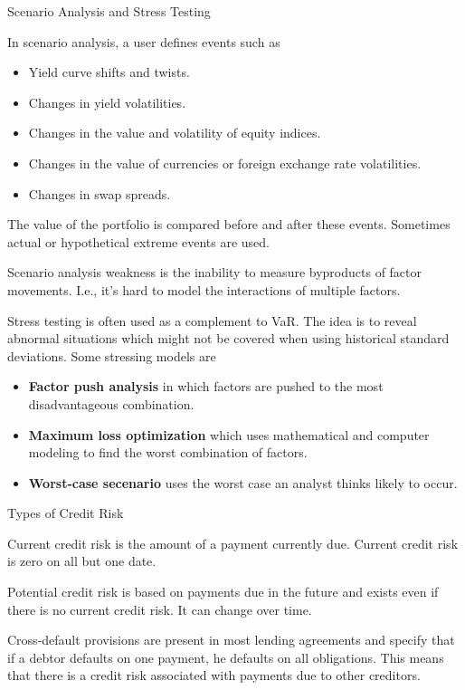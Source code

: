 \documentclass[../custom]{flashcards}
\begin{document}
\begin{flashcard}[\studyArea]{Scenario Analysis and Stress Testing}
    \begin{flushleft}
        In scenario analysis, a user defines events such as
        \begin{itemize}[parsep=1pt,itemsep=1pt]
            \item Yield curve shifts and twists.
            \item Changes in yield volatilities.
            \item Changes in the value and volatility of equity indices.
            \item Changes in the value of currencies or foreign exchange rate volatilities.
            \item Changes in swap spreads.
        \end{itemize}
        The value of the portfolio is compared before and after these events. Sometimes actual or hypothetical extreme events are used.\newline

        Scenario analysis weakness is the inability to measure byproducts of factor movements. I.e., it's hard to model the interactions of multiple factors.\newline

        Stress testing is often used as a complement to VaR. The idea is to reveal abnormal situations which might not be covered when using historical standard deviations. Some stressing models are
        \begin{itemize}[parsep=1pt,itemsep=1pt]
            \item \textbf{Factor push analysis} in which factors are pushed to the most disadvantageous combination.
            \item \textbf{Maximum loss optimization} which uses mathematical and computer modeling to find the worst combination of factors.
            \item \textbf{Worst-case secenario} uses the worst case an analyst thinks likely to occur.
        \end{itemize}
    \end{flushleft}
\end{flashcard}

\begin{flashcard}[\studyArea]{Types of Credit Risk}
    \begin{flushleft}
        Current credit risk is the amount of a payment currently due. Current credit risk is zero on all but one date.\newline

        Potential credit risk is based on payments due in the future and exists even if there is no current credit risk. It can change over time.\newline

        Cross-default provisions are present in most lending agreements and specify that if a debtor defaults on one payment, he defaults on all obligations. This means that there is a credit risk associated with payments due to other creditors.
    \end{flushleft}
\end{flashcard}
\end{document}
